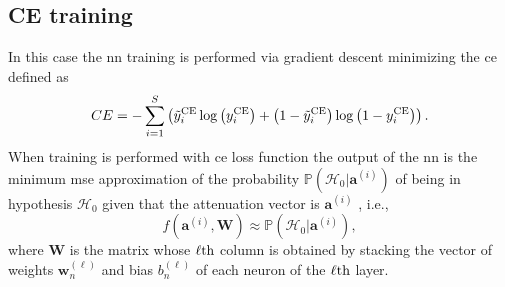 \documentclass[draftcls,onecolumn,12pt]{IEEEtran}
\begin{document}
\subsection{CE training}
In this case the \ac{nn} training is performed via gradient descent minimizing the \ac{ce} defined as
\begin{equation}\label{eq:ce}
CE = -\sum_{i=1}^{S}\left(\tilde{y}_i^{\rm CE}\log\left(y_i^{\rm CE}\right)+\left(1-\tilde{y}_i^{\rm CE}\right)\log\left(1-y_i^{\rm CE}\right) \right).
\end{equation}
When training is performed with \ac{ce} loss function the output of the \ac{nn} is the minimum \ac{mse} approximation of the probability $\mathbb{P}(\mathcal{H}_0|\bm{a}^{(i)})$ of being in hypothesis $\mathcal{H}_0$ given that the attenuation vector is $\bm{a}^{(i)}$ \cite{Bishop2006}, i.e.,
\begin{equation}
    f(\bm{a}^{(i)},\bm{W}) \approx \mathbb{P}(\mathcal{H}_0|\bm{a}^{(i)}),
\end{equation} 
where $\bm{W}$ is the matrix whose $\ell{\rm th}$ column is obtained by stacking the vector of weights $\bm{w}_n^{(\ell)}$ and bias $b_n^{(\ell)}$ of each neuron of the $\ell{\rm th}$ layer.
\end{document}

